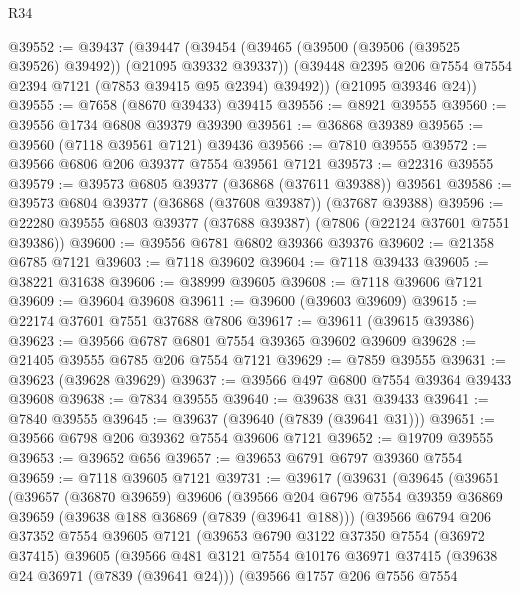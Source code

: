 \begin{lexlean}{R34}
\begin{coremodule}
@39552 := @39437
    (@39447
      (@39454
        (@39465 (@39500 (@39506 (@39525 @39526) @39492)) (@21095 @39332 @39337))
        (@39448 @2395 @206 @7554 @7554 @2394 @7121 (@7853 @39415 @95 @2394) @39492))
      (@21095 @39346 @24))
@39555 := @7658 (@8670 @39433) @39415
@39556 := @8921 @39555
@39560 := @39556 @1734 @6808 @39379 @39390
@39561 := @36868 @39389
@39565 := @39560 (@7118 @39561 @7121) @39436
@39566 := @7810 @39555
@39572 := @39566 @6806 @206 @39377 @7554 @39561 @7121
@39573 := @22316 @39555
@39579 := @39573 @6805 @39377 (@36868 (@37611 @39388)) @39561
@39586 := @39573 @6804 @39377 (@36868 (@37608 @39387)) (@37687 @39388)
@39596 := @22280 @39555 @6803 @39377 (@37688 @39387) (@7806 (@22124 @37601 @7551 @39386))
@39600 := @39556 @6781 @6802 @39366 @39376
@39602 := @21358 @6785 @7121
@39603 := @7118 @39602
@39604 := @7118 @39433
@39605 := @38221 @31638
@39606 := @38999 @39605
@39608 := @7118 @39606 @7121
@39609 := @39604 @39608
@39611 := @39600 (@39603 @39609)
@39615 := @22174 @37601 @7551 @37688 @7806
@39617 := @39611 (@39615 @39386)
@39623 := @39566 @6787 @6801 @7554 @39365 @39602 @39609
@39628 := @21405 @39555 @6785 @206 @7554 @7121
@39629 := @7859 @39555
@39631 := @39623 (@39628 @39629)
@39637 := @39566 @497 @6800 @7554 @39364 @39433 @39608
@39638 := @7834 @39555
@39640 := @39638 @31 @39433
@39641 := @7840 @39555
@39645 := @39637 (@39640 (@7839 (@39641 @31)))
@39651 := @39566 @6798 @206 @39362 @7554 @39606 @7121
@39652 := @19709 @39555
@39653 := @39652 @656
@39657 := @39653 @6791 @6797 @39360 @7554
@39659 := @7118 @39605 @7121
@39731 := @39617
    (@39631
      (@39645
        (@39651
          (@39657
            (@36870 @39659)
            @39606
            (@39566
              @204
              @6796
              @7554
              @39359
              @36869
              @39659
              (@39638 @188 @36869 (@7839 (@39641 @188)))
              (@39566
                @6794
                @206
                @37352
                @7554
                @39605
                @7121
                (@39653
                  @6790
                  @3122
                  @37350
                  @7554
                  (@36972 @37415)
                  @39605
                  (@39566
                    @481
                    @3121
                    @7554
                    @10176
                    @36971
                    @37415
                    (@39638 @24 @36971 (@7839 (@39641 @24)))
                    (@39566
                      @1757
                      @206
                      @7556
                      @7554

\end{coremodule}
\end{lexlean}
